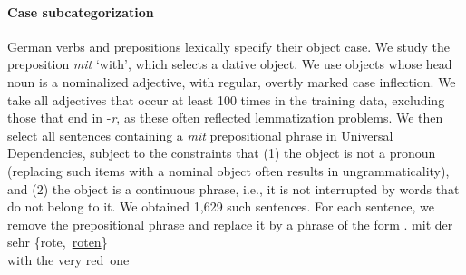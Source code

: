 %
%

\paragraph{Case subcategorization}
German verbs and prepositions lexically specify their object case.  We
study the preposition \textit{mit} `with', which selects a dative
object. We use objects whose head noun is a nominalized adjective,
with regular, overtly marked case inflection.  We take all adjectives
that occur at least 100 times in the training data, excluding those
that end in -\emph{r}, as these often reflected lemmatization
problems. We then select all sentences containing a \emph{mit}
prepositional phrase in Universal Dependencies, subject to the
constraints that (1) the object is not a pronoun (replacing such items with a
nominal object often results in ungrammaticality), and (2) the object
is a continuous phrase, i.e., it is not interrupted by words that do
not belong to it. %
We obtained 1,629 such sentences.  For each sentence, we remove the
prepositional phrase and replace it by a phrase of the form
\exg. mit der sehr \{rote,\ \underline{roten}\} \\
with the very red\ one \\

